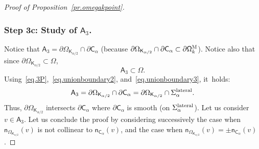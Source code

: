 \documentclass[JEP,XML,SOM,Unicode,NoEqCountersInSection,NoFloatCountersInSection,published]{cedram}
\let\pa\partial
\theoremstyle{plain}
\theoremstyle{definition}
\begin{document}
\begin{proof}[Proof of Proposition~\ref{pr.omegakpoint}]
\subsubsection*{Step 3c: Study of $\mathsf A_3$. }
Notice that $\mathsf A_3=\partial \Omega_{\mathsf K_{\alpha/2}}\cap \pa \mathsf C_\alpha$ (because $\partial \Omega_{\mathsf K_{\alpha/2}}\cap \pa \mathsf C_\alpha\subset \pa \mathsf \Omega_k^{\textsc{M}}$). Notice also that since $\partial \Omega_{\mathsf K_{\alpha/2}}\subset \Omega$,
\begin{equation}\label{eq.A3}
\mathsf A_3 \subset \Omega.
\end{equation}
Using~\eqref{eq.3P},~\eqref{eq.unionboundary2}, and~\eqref{eq.unionboundary3}, it~holds:
\begin{equation}\label{eq.A3-lateral}
\mathsf A_3= \partial \Omega_{\mathsf K_{\alpha/2}}\cap \pa \mathsf C_\alpha =\partial \Omega_{\mathsf K_{\alpha/2}}\cap \Sigma_\alpha^{\textup{lateral}}.
\end{equation}
Thus, $ \partial \Omega_{\mathsf K_{\alpha/2}}$ intersects $ \pa \mathsf C_\alpha$ where $\pa \mathsf C_\alpha$ is smooth (\ie on $\Sigma_\alpha^{\textup{lateral}}$).
Let us consider $v\in \mathsf A_3$. Let us conclude the proof by
considering successively the case when $\mathsf n_{\Omega_{\mathsf
K_{\alpha/2}}}(v)$ is not collinear to $\mathsf n_{\mathsf
C_\alpha}(v)$, and the case when $\mathsf n_{\Omega_{\mathsf K_{\alpha/2}}}(v)=\pm \mathsf n_{\mathsf C_\alpha}(v)$.


\end{proof}
\end{document}
